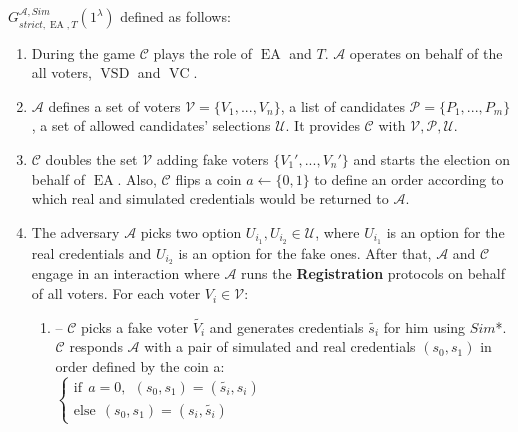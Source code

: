 \documentclass[12pt]{article}
\DeclareMathOperator{\vsd}{VSD}
\DeclareMathOperator{\ea}{EA}
\DeclareMathOperator{\voc}{VC}
\begin{document}
\\\\
 $G_{strict,\ea,T}^{\mathcal{A}, Sim}(1^{\lambda})$ defined as follows:\\
\begin{enumerate}
\item During the game $\mathcal{C}$ plays the role of $\ea$ and $T$. $\mathcal{A}$ operates on behalf of the all voters, $\vsd$ and $\voc$. 
\item $\mathcal{A}$ defines a set of voters  $\mathcal{V} = \{V_1,...,V_n\}$, a list of candidates  $\mathcal{P} = \{P_1,...,P_m\}$, a set of allowed candidates' selections $\mathcal{U}$.  It provides $\mathcal{C}$ with $\mathcal{V}, \mathcal{P}, \mathcal{U}$.
\item $\mathcal{C}$ doubles the set $\mathcal{V}$ adding fake voters $ \{V_1',...,V_n'\}$ and starts the election on behalf of $\ea$. Also, $\mathcal{C}$ flips a coin $a \leftarrow \{0,1\}$ to define an order according to which real and simulated credentials would be returned to $\mathcal{A}$. 
\item The adversary $\mathcal{A}$ picks two option $U_{i_1},U_{i_2} \in \mathcal{U}$, where $U_{i_1}$ is an option for the real credentials and $U_{i_2}$ is an option for the fake ones.  After that, $\mathcal{A}$  and $\mathcal{C}$ engage in an interaction where $\mathcal{A}$ runs the \textbf{Registration} protocols on behalf of all voters. For each voter $V_i \in \mathcal{V}$:
\begin{enumerate}
\item[] -- $\mathcal{C}$ picks a fake voter $\tilde{V_i}$ and generates credentials $\tilde{s_i}$ for him using $Sim$*.  $\mathcal{C}$  responds  $\mathcal{A}$ with a pair of simulated and real credentials $(s_0,s_1)$ in order defined by the coin a:\\
$ \begin{cases}
 \text{if} ~~a =0,~~ (s_0,s_1) = (\tilde{s_i},s_i)  \\ 
 \text{else}~~  (s_0,s_1) = (s_i,\tilde{s_i})
\end{cases}$\\


\end{enumerate}
\end{enumerate}
\end{document}
